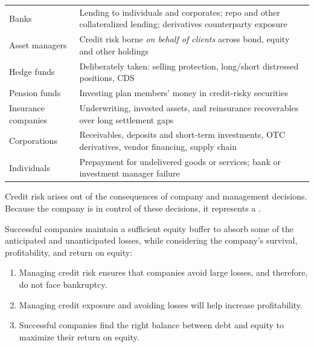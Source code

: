 \begin{crkeybox}
\footnotesize
\begin{tabular}{L{3.1cm} L{11.6cm}}
 &  \\[2pt]
\hline
Banks & Lending to individuals and corporates; repo and other collateralized
lending; derivatives counterparty exposure \\
Asset managers & Credit risk borne \emph{on behalf of clients} across bond,
equity and other holdings \\
Hedge funds & Deliberately taken: selling protection, long/short distressed
positions, CDS \\
Pension funds & Investing plan members' money in credit-risky securities \\
Insurance companies & Underwriting, invested assets, and reinsurance
recoverables over long settlement gaps \\
Corporations & Receivables, deposits and short-term investments, OTC
derivatives, vendor financing, supply chain \\
Individuals & Prepayment for undelivered goods or services; bank or investment
manager failure \\
\end{tabular}
\end{crkeybox}


Credit risk arises out of the consequences of company and management decisions.
Because the company is in control of these decisions, it represents a
.

Successful companies maintain a sufficient equity buffer to absorb some of the
anticipated and unanticipated losses, while considering the company's survival,
profitability, and return on equity:

\begin{enumerate}[label=\Alph*.]
\item {} Managing credit risk ensures that companies avoid large
losses, and therefore, do not face bankruptcy.
\item {} Managing credit exposure and avoiding losses will
help increase profitability.
\item {} Successful companies find the right balance
between debt and equity to maximize their return on equity.
\end{enumerate}
